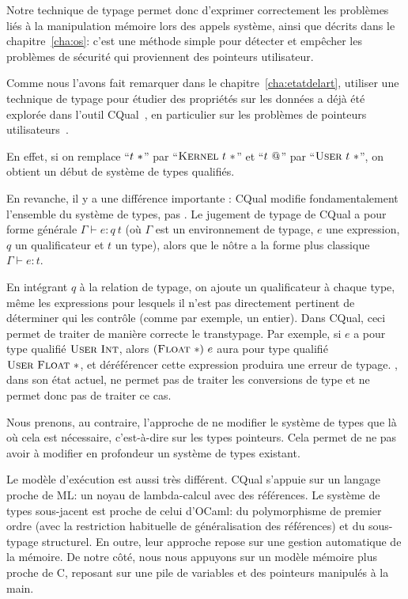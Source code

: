 Notre technique de typage permet donc d'exprimer correctement les problèmes liés
à la manipulation mémoire lors des appels système, ainsi que décrits dans le
chapitre~\ref{cha:os}: c'est une méthode simple pour détecter et empêcher les
problèmes de sécurité qui proviennent des pointeurs utilisateur.

Comme nous l'avons fait remarquer dans le chapitre~\ref{cha:etatdelart},
utiliser une technique de typage pour étudier des propriétés sur les données a
déjà été explorée dans l'outil CQual~\cite{pldi99}, en particulier sur les
problèmes de pointeurs utilisateurs~\cite{cquk-usenix04}.

En effet, si on remplace \enquote{$t~*$} par \enquote{$\textsc{Kernel}~t~*$} et
\enquote{$t~@$} par \enquote{$\textsc{User}~t~*$}, on obtient un début de système
de types qualifiés.

En revanche, il y a une différence importante : CQual modifie fondamentalement
l'ensemble du système de types, pas \langname. Le jugement de typage de CQual a
pour forme générale $Γ ⊢ e : q~t$ (où $Γ$ est un environnement de typage, $e$
une expression, $q$ un qualificateur et $t$ un type), alors que le nôtre a la
forme plus classique $Γ ⊢ e : t$.

En intégrant $q$ à la relation de typage, on ajoute un qualificateur à chaque
type, même les expressions pour lesquels il n'est pas directement pertinent de
déterminer qui les contrôle (comme par exemple, un entier). Dans CQual, ceci
permet de traiter de manière correcte le transtypage. Par exemple, si $e$ a pour
type qualifié $\textsc{User}~\textsc{Int}$, alors $(\textsc{Float}~*)~e$ aura pour type qualifié
$\textsc{User}~\textsc{Float}~*$, et déréférencer cette expression produira une erreur de
typage. \langname, dans son état actuel, ne permet pas de traiter les
conversions de type et ne permet donc pas de traiter ce cas.

Nous prenons, au contraire, l'approche de ne modifier le système de types que là
où cela est nécessaire, c'est-à-dire sur les types pointeurs. Cela permet de ne
pas avoir à modifier en profondeur un système de types existant.

Le modèle d'exécution est aussi très différent. CQual s'appuie sur un langage
proche de ML: un noyau de lambda-calcul avec des références. Le système de types
sous-jacent est proche de celui d'OCaml: du polymorphisme de premier ordre (avec
la restriction habituelle de généralisation des références) et du sous-typage
structurel. En outre, leur approche repose sur une gestion automatique de la
mémoire. De notre côté, nous nous appuyons sur un modèle mémoire plus proche de
C, reposant sur une pile de variables et des pointeurs manipulés à la main.

